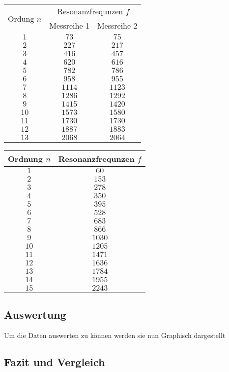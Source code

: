 \begin{center}
\begin{tabular}{c|cc}
\multirow{2}{*}{Ordung \(n\)} & \multicolumn{2}{c}{Resonanzfrequnzen \(f\)}\\
 & Messreihe 1 & Messreihe 2 \\\hline
\(1\) & \(73\) & \(75\) \\ 
\(2\) & \(227\) & \(217\) \\ 
\(3\) & \(416\) & \(457\) \\ 
\(4\) & \(620\) & \(616\) \\ 
\(5\) & \(782\) & \(786\) \\ 
\(6\) & \(958\) & \(955\) \\ 
\(7\) & \(1114\) & \(1123\) \\ 
\(8\) & \(1286\) & \(1292\) \\ 
\(9\) & \(1415\) & \(1420\) \\ 
\(10\) & \(1573\) & \(1580\) \\ 
\(11\) & \(1730\) & \(1730\) \\ 
\(12\) & \(1887\) & \(1883\) \\ 
\(13\) & \(2068\) & \(2064\) \\
\end{tabular}
\vspace{1cm}
\begin{tabular}{c|c}
Ordnung \(n\) & Resonanzfrequnzen \(f\) \\\hline
\(1\) & \(60\) \\ 
\(2\) & \(153\) \\ 
\(3\) & \(278\) \\ 
\(4\) & \(350\) \\ 
\(5\) & \(395\) \\ 
\(6\) & \(528\) \\ 
\(7\) & \(683\) \\ 
\(8\) & \(866\) \\ 
\(9\) & \(1030\) \\ 
\(10\) & \(1205\) \\ 
\(11\) & \(1471\) \\ 
\(12\) & \(1636\) \\ 
\(13\) & \(1784\) \\ 
\(14\) & \(1955\) \\ 
\(15\) & \(2243\) \\
\end{tabular}
\end{center}
\subsection{Auswertung}
Um die Daten auswerten zu können werden sie nun Graphisch dargestellt
\subsection{Fazit und Vergleich}